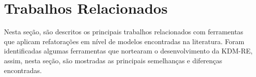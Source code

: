 


\section{Trabalhos Relacionados}\label{sec:trabalhos_relacionados_ferramentas_kdm_re}

Nesta seção, são descritos os principais trabalhos relacionados com ferramentas que aplicam refatorações em nível de modelos encontradas na literatura. Foram identificadas algumas ferramentas que nortearam o desenvolvimento da KDM-RE, assim, nesta seção, são mostradas as principais semelhanças e diferenças encontradas.

